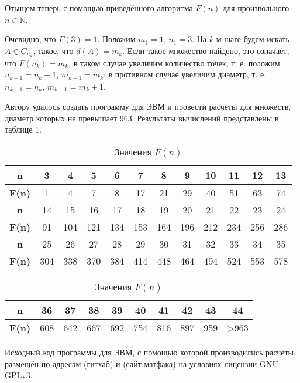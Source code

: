 \documentclass{article}
\begin{document}
Отыщем теперь с помощью приведённого алгоритма $F(n)$ для произвольного $n \in \mathbb{N}$.

Очевидно, что $F(3) = 1$.
Положим $m_1=1$, $n_1=3$.
На $k$-м шаге будем искать $A \in C_{n_k}$, такое, что $d(A) = m_k$.
Если такое множество найдено, это означает, что $F(n_k)=m_k$,
в таком случае увеличим количество точек, т. е. положим $n_{k+1} = n_k +1$, $m_{k+1} = m_k$;
в противном случае увеличим диаметр, т. е. $n_{k+1} = n_k$, $m_{k+1} = m_k +1$.



Автору удалось создать программу для ЭВМ и провести расчёты для множеств, диаметр которых не превышает 963.
Результаты вычислений представлены в таблице 1.


\begin{table}[H]
\caption{Значения $F(n)$}
\label{tabular:pc_counted}
\begin{center}
\begin{tabular}{|c|c|c|c|c|c|c|c|c|c|c|c|}
\hline
\textbf{n}    &  3 & 4 & 5 & 6 &  7 &  8 &  9 & 10 & 11 & 12 & 13 \\
\hline
\textbf{F(n)} &  1 & 4 & 7 & 8 & 17 & 21 & 29 & 40 & 51 & 63 & 74  \\
\hline
\hline
\textbf{n}    &  14 &  15 &  16 &  17 &  18 &  19 &  20 &  21 &  22 &  23 &  24 \\
\hline
\textbf{F(n)} &  91 & 104 & 121 & 134 & 153 & 164 & 196 & 212 & 234 & 256 & 286  \\
\hline
\hline
\textbf{n}    &  25 &  26 &  27 &  28 &  29 &  30 &  31 &  32 &  33 &  34 &  35 \\
\hline
\textbf{F(n)} & 304 & 338 & 370 & 384 & 414 & 448 & 464 & 494 & 524 & 553 & 578  \\
\hline
\end{tabular}
\begin{tabular}{|c|c|c|c|c|c|c|c|c|c|}
\hline
\textbf{n}    &  36 &  37 &  38 &  39 &  40 &  41 &  42 &  43 & 44 \\

\hline
\textbf{F(n)} & 608 & 642 & 667 & 692 & 754 & 816 & 897 & 959 & >963 \\
\hline
\end{tabular}
\end{center}
\end{table}


Исходный код программы для ЭВМ, с помощью которой производились расчёты, размещён по адресам (гитхаб) и (сайт матфака) на условиях лицензии GNU GPLv3. 
\end{document}
